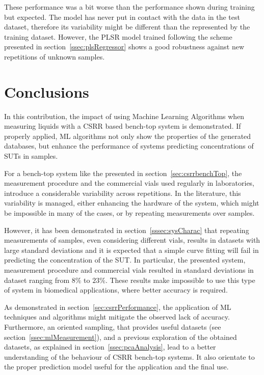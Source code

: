 \documentclass[journal,twoside,web]{ieeecolor}
\begin{document}
These performance was a bit worse than the performance shown during training but expected. The model has never put in contact with the data in the test dataset, therefore its variability might be different than the represented by the training dataset. However, the PLSR model trained following the scheme presented in section~\ref{ssec:plsRegressor} shows a good robustness against new repetitions of unknown samples.  

\section{Conclusions}
\label{sec:conclusion}

In this contribution, the impact of using Machine Learning Algorithms when measuring liquids with a CSRR based bench-top system is demonstrated. If properly applied, ML algorithms not only show the properties of the generated databases, but enhance the performance of systems predicting concentrations of SUTs in samples.

For a bench-top system like the presented in section~\ref{sec:csrrbenchTop}, the measurement procedure and the commercial vials used regularly in laboratories, introduce a considerable variability across repetitions. In the literature, this variability is managed, either enhancing the hardware of the system, which might be impossible in many of the cases, or by repeating measurements over samples. 

However, it has been demonstrated in section~\ref{sssec:sysCharac} that repeating measurements of samples, even considering different vials, results in datasets with large standard deviations and it is expected that a simple curve fitting will fail in predicting the concentration of the SUT. In particular, the presented system, measurement procedure and commercial vials resulted in standard deviations in dataset ranging from $8\%$ to $23\%$. These results make impossible to use this type of system in biomedical applications, where better accuracy is required.

As demonstrated in section~\ref{sec:csrrPerformance}, the application of ML techniques and algorithms might mitigate the observed lack of accuracy. Furthermore, an oriented sampling, that provides useful datasets (see section~\ref{ssec:mlMeasurement}), and a previous exploration of the obtained datasets, as explained in section~\ref{ssec:pcaAnalysis}, lead to a better understanding of the behaviour of CSRR bench-top systems. It also orientate to the proper prediction model useful for the application and the final use.
\end{document}
